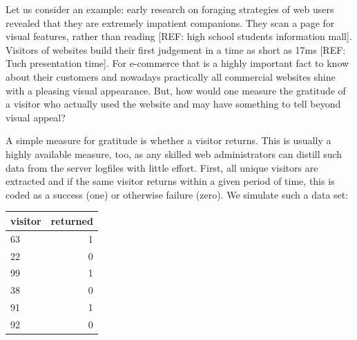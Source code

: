 \documentclass[]{svmono}
\newenvironment{Shaded}{\begin{snugshade}}{\end{snugshade}}
\newcommand{\KeywordTok}[1]{\textcolor[rgb]{0.13,0.29,0.53}{\textbf{#1}}}
\newcommand{\DataTypeTok}[1]{\textcolor[rgb]{0.13,0.29,0.53}{#1}}
\newcommand{\DecValTok}[1]{\textcolor[rgb]{0.00,0.00,0.81}{#1}}
\newcommand{\StringTok}[1]{\textcolor[rgb]{0.31,0.60,0.02}{#1}}
\newcommand{\OperatorTok}[1]{\textcolor[rgb]{0.81,0.36,0.00}{\textbf{#1}}}
\newcommand{\NormalTok}[1]{#1}
\begin{document}
Let us consider an example: early research on foraging strategies of web
users revealed that they are extremely impatient companions. They scan a
page for visual features, rather than reading {[}REF: high school
students information mall{]}. Visitors of websites build their first
judgement in a time as short as 17ms {[}REF: Tuch presentation time{]}.
For e-commerce that is a highly important fact to know about their
customers and nowadays practically all commercial websites shine with a
pleasing visual appearance. But, how would one measure the gratitude of
a visitor who actually used the website and may have something to tell
beyond visual appeal?

A simple measure for gratitude is whether a visitor returns. This is
usually a highly available measure, too, as any skilled web
administrators can distill such data from the server logfiles with
little effort. First, all unique visitors are extracted and if the same
visitor returns within a given period of time, this is coded as a
success (one) or otherwise failure (zero). We simulate such a data set:

\begin{Shaded}
\end{Shaded}

\begin{tabular}{l|r}
\hline
visitor & returned\\
\hline
63 & 1\\
\hline
22 & 0\\
\hline
99 & 1\\
\hline
38 & 0\\
\hline
91 & 1\\
\hline
92 & 0\\
\hline
\end{tabular}
\end{document}
